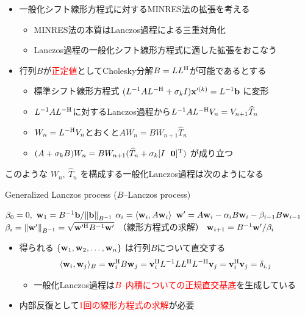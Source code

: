 
\begin{itemize}
	\item 一般化シフト線形方程式に対するMINRES法の拡張を考える
		\begin{itemize}
			\item MINRES法の本質はLanczos過程による三重対角化
			\item Lanczos過程の一般化シフト線形方程式に適した拡張をおこなう
		\end{itemize}
	\item 行列$B$が\textcolor{red}{正定値}としてCholesky分解$B=LL^{\mathrm{H}}$が可能であるとする
		\begin{itemize}
			\item 標準シフト線形方程式 $(L^{-1}AL^{-\mathrm{H}} + \sigma_{k}I)\vb{x}'^{(k)} = L^{-1}\vb{b}$ に変形
			\item $L^{-1}AL^{-\mathrm{H}}$に対するLanczos過程から$L^{-1}AL^{-\mathrm{H}}V_{n} = V_{n+1}\widehat{T}_{n}$
			\item $W_{n} = L^{-\mathrm{H}}V_{n}$とおくと$AW_{n}=BW_{n+1}\widehat{T}_{n}$
			\item $(A+\sigma_{k}B)W_{n}=BW_{n+1}(\widehat{T}_{n} + \sigma_{k}[I \ \  \vb{0}]^{\mathrm{T}})$ が成り立つ
		\end{itemize}
\end{itemize}
\vspace{4.7pt}
このような $W_{n},\ \widehat{T}_{n}$ を構成する一般化Lanczos過程は次のようになる
\begin{algorithm}[H]
   \caption{ Generalized Lanczos process ($B$--Lanczos process)}
   \label{alg-ex-lanczos}
   \begin{algorithmic}[1]
   	\vspace{-0.4\baselineskip}
   	\State $\beta_0 = 0,\ \vb{w}_1 = B^{-1}\vb{b} / \norm{\vb{b}}_{B^{-1}}$
   		\State $\alpha_i = \langle \vb{w}_i, A\vb{w}_i \rangle$
   		\State $\vb{w}' = A\vb{w}_i - \alpha_i B\vb{w}_i - \beta_{i-1} B \vb{w}_{i-1}$
   		\State $\beta_i = \norm{\vb{w}'}_{B^{-1}} = \sqrt{\vb{w}'^{\mathrm{H}} B^{-1} \vb{w}'}$ （線形方程式の求解）
   		\State $\vb{w}_{i+1} = B^{-1}\vb{w}' / \beta_i$
   	\EndFor
   \end{algorithmic}
\end{algorithm}
\vspace{-10pt}
\begin{itemize}
	\item 得られる $\{ \vb{w}_{1}, \vb{w}_{2}, \dots, \vb{w}_{n} \}$ は行列$B$について直交する
	\begin{align}
		\langle \vb{w}_{i}, \vb{w}_{j} \rangle_{B} = \vb{w}_{i}^{\mathrm{H}} B \vb{w}_{j} = \vb{v}_{i}^{\mathrm{H}} L^{-1} LL^{\mathrm{H}} L^{-\mathrm{H}} \vb{v}_{j} = \vb{v}_{i}^{\mathrm{H}} \vb{v}_{j} = \delta_{i,j}
	\end{align}
	\vspace{-\baselineskip}
	\vspace{2pt}
	\begin{itemize}
		\item 一般化Lanczos過程は\textcolor{red}{$B$--内積についての正規直交基底}を生成している
	\end{itemize}
	\item 内部反復として\textcolor{red}{1回の線形方程式の求解}が必要
\end{itemize}



